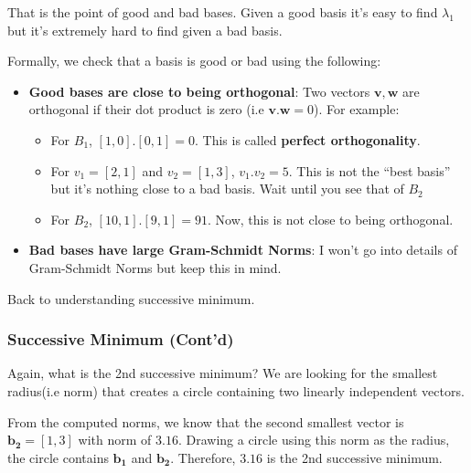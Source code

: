 \documentclass[11pt]{article}
\providecommand{\tightlist}{%
      \setlength{\itemsep}{0pt}\setlength{\parskip}{0pt}}
\begin{document}
That is the point of good and bad bases. Given a good basis it's easy to
find \(\lambda_1\) but it's extremely hard to find given a bad basis.

Formally, we check that a basis is good or bad using the following:

\begin{itemize}
\tightlist
\item
  \textbf{Good bases are close to being orthogonal}: Two vectors
  \(\mathbf{v}, \mathbf{w}\) are orthogonal if their dot product is zero
  (i.e \(\mathbf{v} . \mathbf{w} = 0\)). For example:

  \begin{itemize}
  \tightlist
  \item
    For \(B_1\), \([1, 0].[0, 1] = 0\). This is called \textbf{perfect
    orthogonality}.
  \item
    For \(v_1 = [2, 1]\) and \(v_2 = [1, 3]\), \(v_1.v_2 = 5\). This is
    not the ``best basis'' but it's nothing close to a bad basis. Wait
    until you see that of \(B_2\)
  \item
    For \(B_2\), \([10, 1].[9, 1] = 91\). Now, this is not close to
    being orthogonal.
  \end{itemize}
\item
  \textbf{Bad bases have large Gram-Schmidt Norms}: I won't go into
  details of Gram-Schmidt Norms but keep this in mind.
\end{itemize}

Back to understanding successive minimum.

    \subsubsection{Successive Minimum
(Cont'd)}\label{successive-minimum-contd}

    Again, what is the 2nd successive minimum? We are looking for the
smallest radius(i.e norm) that creates a circle containing two linearly
independent vectors.

From the computed norms, we know that the second smallest vector is
\(\mathbf{b_2} = [1, 3]\) with norm of \(3.16\). Drawing a circle using
this norm as the radius, the circle contains \(\mathbf{b_1}\) and
\(\mathbf{b_2}\). Therefore, \(3.16\) is the 2nd successive minimum.

    \begin{center}
    \end{center}
    { \hspace*{\fill} \\}
    
\end{document}
